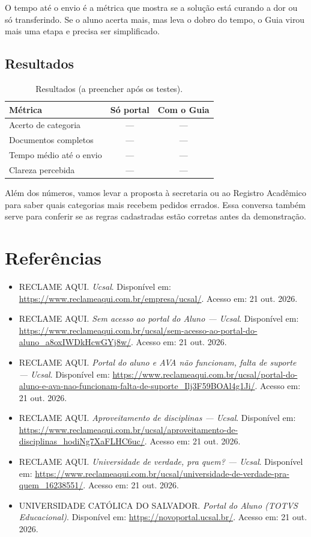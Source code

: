 \documentclass[12pt,a4paper]{article}
\begin{document}
O tempo até o envio é a métrica que mostra se a solução está curando a dor ou só transferindo. Se o
aluno acerta mais, mas leva o dobro do tempo, o Guia virou mais uma etapa e precisa ser simplificado.

\subsection{Resultados}

\begin{table}[H]
\centering
\small
\begin{tabular}{@{}lcc@{}}
\toprule
Métrica & Só portal & Com o Guia \\
\midrule
Acerto de categoria & --- & --- \\
Documentos completos & --- & --- \\
Tempo médio até o envio & --- & --- \\
Clareza percebida & --- & --- \\
\bottomrule
\end{tabular}
\caption{Resultados (a preencher após os testes).}
\end{table}

Além dos números, vamos levar a proposta à secretaria ou ao Registro Acadêmico para saber quais
categorias mais recebem pedidos errados. Essa conversa também serve para conferir se as regras
cadastradas estão corretas antes da demonstração.

\section*{Referências}
\raggedright

\begin{itemize}[label={},leftmargin=0pt]
  \item RECLAME AQUI. \emph{Ucsal}. Disponível em:
        \url{https://www.reclameaqui.com.br/empresa/ucsal/}. Acesso em: 21 out. 2026.
  \item RECLAME AQUI. \emph{Sem acesso ao portal do Aluno --- Ucsal}. Disponível em:
        \url{https://www.reclameaqui.com.br/ucsal/sem-acesso-ao-portal-do-aluno_a8oxIWDkHcwGYj8w/}.
        Acesso em: 21 out. 2026.
  \item RECLAME AQUI. \emph{Portal do aluno e AVA não funcionam, falta de suporte --- Ucsal}.
        Disponível em:
        \url{https://www.reclameaqui.com.br/ucsal/portal-do-aluno-e-ava-nao-funcionam-falta-de-suporte_Ilj3F59BOAl4g1Ji/}.
        Acesso em: 21 out. 2026.
  \item RECLAME AQUI. \emph{Aproveitamento de disciplinas --- Ucsal}. Disponível em:
        \url{https://www.reclameaqui.com.br/ucsal/aproveitamento-de-disciplinas_hodiNg7XaFLHC6uc/}.
        Acesso em: 21 out. 2026.
  \item RECLAME AQUI. \emph{Universidade de verdade, pra quem? --- Ucsal}. Disponível em:
        \url{https://www.reclameaqui.com.br/ucsal/universidade-de-verdade-pra-quem_16238551/}.
        Acesso em: 21 out. 2026.
  \item UNIVERSIDADE CATÓLICA DO SALVADOR. \emph{Portal do Aluno (TOTVS Educacional)}. Disponível em:
        \url{https://novoportal.ucsal.br/}. Acesso em: 21 out. 2026.
\end{itemize}
\end{document}
